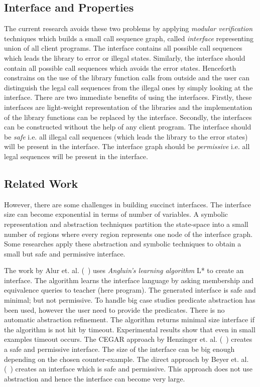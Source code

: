 \documentclass{llncs}
\begin{document}
\subsection{Interface and Properties}


 The current research \cite{FSE05,ACMN05,CAV07b} avoids these two problems by applying  \emph{modular verification} techniques which builds a small call sequence graph, called \emph{interface} representing union of all client programs. 
The  interface contains all possible call sequences which leads the library to error or illegal states. 
Similarly, the interface should contain all possible call sequences which avoids the error states. 
Henceforth constrains on the use of the library function calls from outside and the user can distinguish
the legal call sequences from the illegal ones by simply looking at the interface. 
 There are two immediate benefits of using the interfaces. 
Firstly, these interfaces are light-weight representation of the libraries and the implementation of the library functions can be replaced by the interface.
Secondly, the interfaces can be constructed without the help of any client program.
The interface should be \emph{safe} i.e. all illegal call sequences (which leads the library to the error states) will be present in the interface.
 The interface graph should be \emph{permissive}  i.e.  all legal sequences will be present in
 the interface.



\subsection{Related Work}

However, there are some challenges in building succinct interfaces.
The interface size can become exponential in terms of number of 
variables.
A symbolic representation and abstraction techniques partition the state-space into a small number of regions where every region represents one node of the interface graph. 
Some researches  apply these abstraction and symbolic techniques to obtain a small but safe and permissive interface.
 
 The work by Alur et. al. (~\cite{ACMN05}) uses {\em Angluin's learning algorithm} L* to create 
 an interface.
The algorithm learns the interface language by asking membership and equivalence queries to teacher
(here program).
The generated interface is  safe and minimal; but not permissive. 
To handle big case studies predicate abstraction has been used, however the user need to 
provide the predicates.
There is no automatic abstraction refinement.
The algorithm returns minimal size interface if the algorithm is not hit by timeout.
Experimental results show that  even in small examples timeout occurs.
The CEGAR approach by Henzinger et. al. (~\cite{FSE05}) creates a safe and permissive interface.
The size of the interface can be big enough depending on the chosen counter-example. 
The direct approach by Beyer et. al. (~\cite{CAV07b}) creates an interface which is safe and permissive.
This approach does not use abstraction and hence the interface can become very large.  
\end{document}
